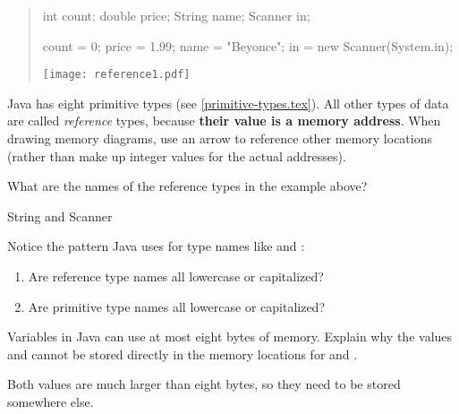 
\begin{quote}
\begin{multicols}{2}

\begin{javalst}
int count;
double price;
String name;
Scanner in;

count = 0;
price = 1.99;
name = "Beyonce";
in = new Scanner(System.in);
\end{javalst}

\texttt{[image: reference1.pdf]}

\end{multicols}
\end{quote}

Java has eight primitive types (see \ref{primitive-types.tex}).
All other types of data are called \emph{reference} types, because \textbf{their value is a memory address}.
When drawing memory diagrams, use an arrow to reference other memory locations (rather than make up integer values for the actual addresses).




\Q What are the names of the reference types in the example above?

\begin{answer}[2em]
String and Scanner
\end{answer}


\Q Notice the pattern Java uses for type names like  and :

\begin{enumerate}

\item Are reference type names all lowercase or capitalized?

\item Are primitive type names all lowercase or capitalized?

\end{enumerate}


\Q Variables in Java can use at most eight bytes of memory. Explain why the values  and  cannot be stored directly in the memory locations for  and .

\begin{answer}[3em]
Both values are much larger than eight bytes, so they need to be stored somewhere else.
\end{answer}


